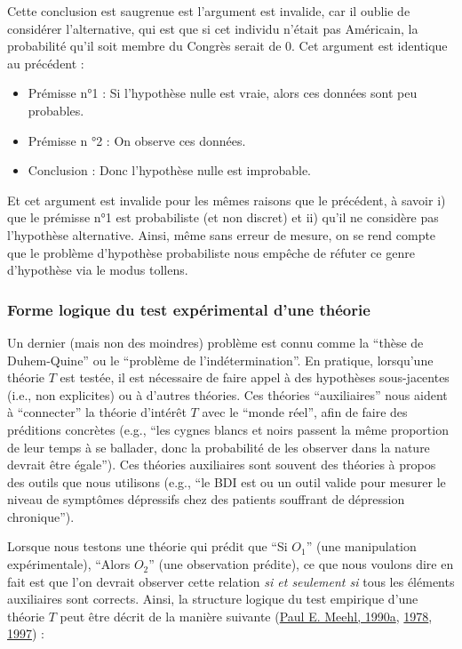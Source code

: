 \documentclass[
  a4paper,11pt,twoside,onecolumn,openright,final,oldfontcommands]{memoir}
\theoremstyle{definition}
\theoremstyle{definition}
\theoremstyle{definition}
\theoremstyle{definition}
\theoremstyle{remark}
\begin{document}
Cette conclusion est saugrenue est l'argument est invalide, car il oublie de considérer l'alternative, qui est que si cet individu n'était pas Américain, la probabilité qu'il soit membre du Congrès serait de 0. Cet argument est identique au précédent :

\begin{itemize}
\item
  Prémisse n°1 : Si l'hypothèse nulle est vraie, alors ces données sont peu probables.
\item
  Prémisse n °2 : On observe ces données.
\item
  Conclusion : Donc l'hypothèse nulle est improbable.
\end{itemize}

Et cet argument est invalide pour les mêmes raisons que le précédent, à savoir i) que le prémisse n°1 est probabiliste (et non discret) et ii) qu'il ne considère pas l'hypothèse alternative. Ainsi, même sans erreur de mesure, on se rend compte que le problème d'hypothèse probabiliste nous empêche de réfuter ce genre d'hypothèse via le modus tollens.

\hypertarget{forme-logique-du-test-expuxe9rimental-dune-thuxe9orie}{%
\subsubsection{Forme logique du test expérimental d'une théorie}\label{forme-logique-du-test-expuxe9rimental-dune-thuxe9orie}}

Un dernier (mais non des moindres) problème est connu comme la ``thèse de Duhem-Quine'' ou le ``problème de l'indétermination''. En pratique, lorsqu'une théorie \(T\) est testée, il est nécessaire de faire appel à des hypothèses sous-jacentes (i.e., non explicites) ou à d'autres théories. Ces théories ``auxiliaires'' nous aident à ``connecter'' la théorie d'intérêt \(T\) avec le ``monde réel'', afin de faire des préditions concrètes (e.g., ``les cygnes blancs et noirs passent la même proportion de leur temps à se ballader, donc la probabilité de les observer dans la nature devrait être égale''). Ces théories auxiliaires sont souvent des théories à propos des outils que nous utilisons (e.g., ``le BDI est ou un outil valide pour mesurer le niveau de symptômes dépressifs chez des patients souffrant de dépression chronique'').

Lorsque nous testons une théorie qui prédit que ``Si \(O_{1}\)'' (une manipulation expérimentale), ``Alors \(O_{2}\)'' (une observation prédite), ce que nous voulons dire en fait est que l'on devrait observer cette relation \emph{si et seulement si} tous les éléments auxiliaires sont corrects. Ainsi, la structure logique du test empirique d'une théorie \(T\) peut être décrit de la manière suivante (\protect\hyperlink{ref-meehl_appraising_1990}{Paul E. Meehl, 1990a}, \protect\hyperlink{ref-meehl_theoretical_1978}{1978}, \protect\hyperlink{ref-harlow_problem_1997}{1997}) :
\end{document}
